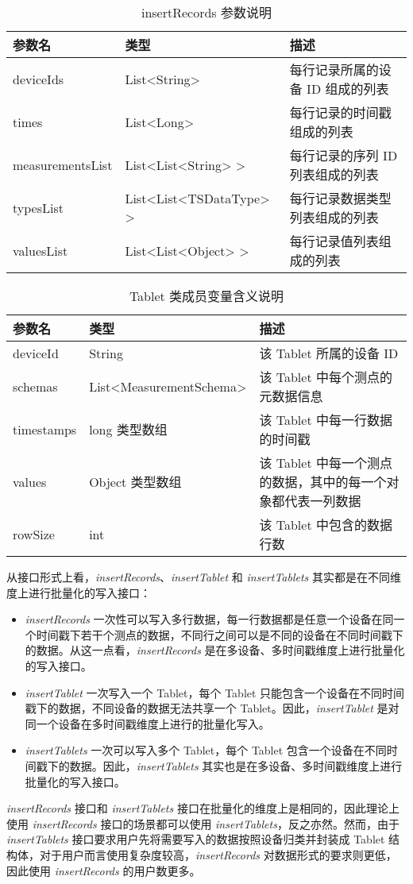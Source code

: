 \begin{table}
  \centering
  \caption{insertRecords 参数说明}
  \begin{tabular}{lll}
    \toprule
    参数名 &  类型 & 描述 \\
    \midrule
    deviceIds & List<String> & 每行记录所属的设备 ID 组成的列表 \\
     times & List<Long> & 每行记录的时间戳组成的列表 \\
    measurementsList & List<List<String> > & 每行记录的序列 ID 列表组成的列表 \\
    typesList & List<List<TSDataType> > & 每行记录数据类型列表组成的列表 \\
    valuesList & List<List<Object> > & 每行记录值列表组成的列表 \\
    \bottomrule
  \end{tabular}
  \label{tabular:insert-records-params}
\end{table}

\begin{table}
  \centering
  \caption{Tablet 类成员变量含义说明}
  \begin{tabular}{llp{6cm}}
    \toprule
    参数名 &  类型 & 描述 \\
    \midrule
    deviceId & String & 该 Tablet 所属的设备 ID \\
    schemas & List<MeasurementSchema> & 该 Tablet 中每个测点的元数据信息 \\
    timestamps & long 类型数组 & 该 Tablet 中每一行数据的时间戳 \\
    values & Object 类型数组 & 该 Tablet 中每一个测点的数据，其中的每一个对象都代表一列数据 \\
    rowSize & int & 该 Tablet 中包含的数据行数\\
    \bottomrule
  \end{tabular}
  \label{tabular:class-tablet-param}
\end{table}

从接口形式上看，\emph{insertRecords}、\emph{insertTablet} 和 \emph{insertTablets} 其实都是在不同维度上进行批量化的写入接口：
\begin{itemize}
  \item \emph{insertRecords} 一次性可以写入多行数据，每一行数据都是任意一个设备在同一个时间戳下若干个测点的数据，不同行之间可以是不同的设备在不同时间戳下的数据。从这一点看，\emph{insertRecords} 是在多设备、多时间戳维度上进行批量化的写入接口。
  \item \emph{insertTablet} 一次写入一个 Tablet，每个 Tablet 只能包含一个设备在不同时间戳下的数据，不同设备的数据无法共享一个 Tablet。因此，\emph{insertTablet} 是对同一个设备在多时间戳维度上进行的批量化写入。
  \item \emph{insertTablets} 一次可以写入多个 Tablet，每个 Tablet 包含一个设备在不同时间戳下的数据。因此，\emph{insertTablets} 其实也是在多设备、多时间戳维度上进行批量化的写入接口。
\end{itemize}
\emph{insertRecords} 接口和 \emph{insertTablets} 接口在批量化的维度上是相同的，因此理论上使用 \emph{insertRecords} 接口的场景都可以使用 \emph{insertTablets}，反之亦然。然而，由于 \emph{insertTablets} 接口要求用户先将需要写入的数据按照设备归类并封装成 Tablet 结构体，对于用户而言使用复杂度较高，\emph{insertRecords} 对数据形式的要求则更低，因此使用 \emph{insertRecords} 的用户数更多。
